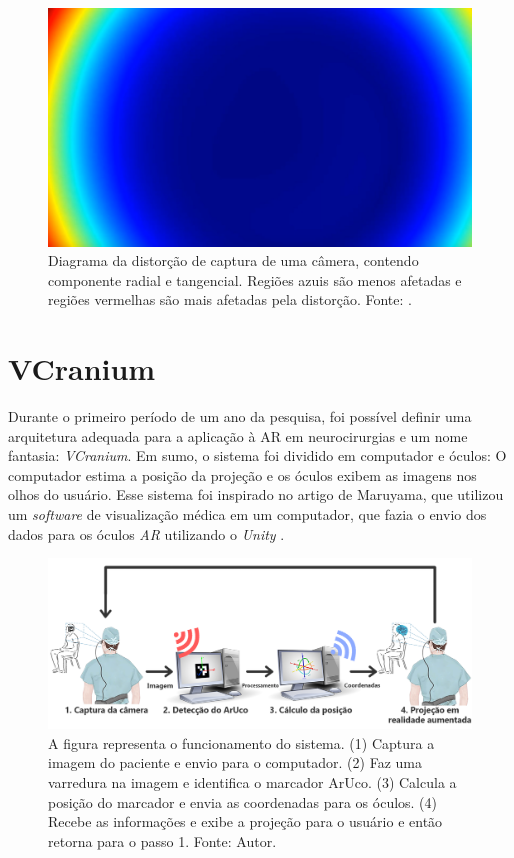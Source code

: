 \begin{figure}[H]
    \centering
    \includegraphics[width=.5\linewidth]{figuras/Distortion Color.png}
    \caption{Diagrama da distorção de captura de uma câmera, contendo componente radial e tangencial. Regiões azuis são menos afetadas e regiões vermelhas são mais afetadas pela distorção. Fonte: \cite{augmented-calib}.}
    \label{fig:distort-diagram}
\end{figure}

\section{VCranium}\label{chp:vcranium} 

Durante o primeiro período de um ano da pesquisa, foi possível definir uma arquitetura adequada para a aplicação à AR em neurocirurgias e um nome fantasia: \textit{VCranium}. Em sumo, o sistema foi dividido em computador e óculos: O computador estima a posição da projeção e os óculos exibem as imagens nos olhos do usuário. Esse sistema foi inspirado no artigo de Maruyama, que utilizou um \textit{software} de visualização médica em um computador, que fazia o envio dos dados para os óculos \textit{AR} utilizando o \textit{Unity} \cite{Maruyama2018}.

\begin{figure}[ht]
    \centering
    \includegraphics[width=.9\linewidth]{figuras/System schematic.png}
    \caption{A figura representa o funcionamento do sistema. (1) Captura a imagem do paciente e envio para o computador. (2) Faz uma varredura na imagem e identifica o marcador ArUco. (3) Calcula a posição do marcador e envia as coordenadas para os óculos. (4) Recebe as informações e exibe a projeção para o usuário e então retorna para o passo 1. Fonte: Autor.}
    \label{fig:arc}
\end{figure}

